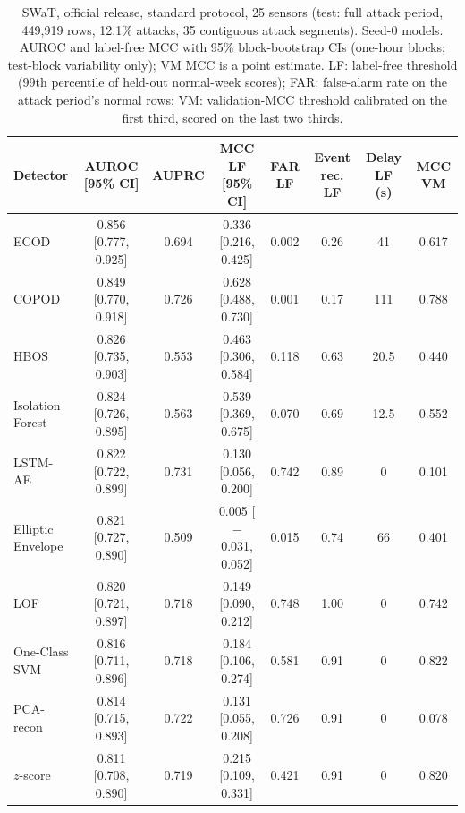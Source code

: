 \documentclass[11pt]{article}
\begin{document}
\begin{table}[t]
\centering\small
\caption{SWaT, official release, standard protocol, 25 sensors (test: full attack
period, 449{,}919 rows, 12.1\% attacks, 35 contiguous attack segments). Seed-0 models.
AUROC and label-free MCC with 95\% block-bootstrap CIs (one-hour blocks; test-block
variability only); VM MCC is a point estimate. LF: label-free threshold (99th
percentile of held-out normal-week scores); FAR: false-alarm rate on the attack
period's normal rows; VM: validation-MCC threshold calibrated on the first third,
scored on the last two thirds.}
\label{tab:swat}
\begin{tabular}{lccccccc}
\toprule
Detector & AUROC [95\% CI] & AUPRC & MCC LF [95\% CI] & FAR LF & Event rec. LF & Delay LF (s) & MCC VM \\
\midrule
ECOD & 0.856 [0.777, 0.925] & 0.694 & 0.336 [0.216, 0.425] & 0.002 & 0.26 & 41 & 0.617 \\
COPOD & 0.849 [0.770, 0.918] & 0.726 & 0.628 [0.488, 0.730] & 0.001 & 0.17 & 111 & 0.788 \\
HBOS & 0.826 [0.735, 0.903] & 0.553 & 0.463 [0.306, 0.584] & 0.118 & 0.63 & 20.5 & 0.440 \\
Isolation Forest & 0.824 [0.726, 0.895] & 0.563 & 0.539 [0.369, 0.675] & 0.070 & 0.69 & 12.5 & 0.552 \\
LSTM-AE & 0.822 [0.722, 0.899] & 0.731 & 0.130 [0.056, 0.200] & 0.742 & 0.89 & 0 & 0.101 \\
Elliptic Envelope & 0.821 [0.727, 0.890] & 0.509 & 0.005 [$-$0.031, 0.052] & 0.015 & 0.74 & 66 & 0.401 \\
LOF & 0.820 [0.721, 0.897] & 0.718 & 0.149 [0.090, 0.212] & 0.748 & 1.00 & 0 & 0.742 \\
One-Class SVM & 0.816 [0.711, 0.896] & 0.718 & 0.184 [0.106, 0.274] & 0.581 & 0.91 & 0 & 0.822 \\
PCA-recon & 0.814 [0.715, 0.893] & 0.722 & 0.131 [0.055, 0.208] & 0.726 & 0.91 & 0 & 0.078 \\
$z$-score & 0.811 [0.708, 0.890] & 0.719 & 0.215 [0.109, 0.331] & 0.421 & 0.91 & 0 & 0.820 \\
\bottomrule
\end{tabular}
\end{table}
\end{document}
